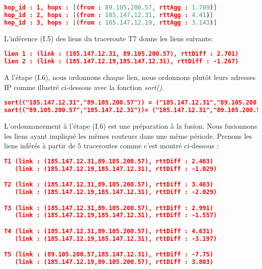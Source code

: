 \begin{lstlisting}[language=json,firstnumber=1, caption={Les saut du traceroute T7 (après l'agrégation)}]
hop_id : 1, hops : [(from : 89.105.200.57, rttAgg : 1.709)]
hop_id : 2, hops : [(from : 185.147.12.31, rttAgg : 4.41)] 
hop_id : 3, hops : [(from : 185.147.12.19, rttAgg : 3.143)]
\end{lstlisting}

L'inférence (I.5) des liens du traceroute T7 donne les liens suivants: 

\begin{lstlisting}[language=json,firstnumber=1, caption={Exemple des liens inférés du traceroute T7}, basicstyle = \small]
lien 1 : (link : (185.147.12.31, 89.105.200.57), rttDiff : 2.701)
lien 2 : (link : (185.147.12.19,185.147.12.31), rttDiff : -1.267)
\end{lstlisting}


A l'étape (I.6), nous ordonnons chaque lien, nous ordonnons plutôt leurs adresses IP comme illustré ci-dessous avec la fonction \textit{sort()}. 

\begin{lstlisting}[language=json,firstnumber=1, caption={Illustration de l'ordre des liens}, basicstyle = \footnotesize]
sort(("185.147.12.31","89.105.200.57")) = ("185.147.12.31","89.105.200.57")
sort(("89.105.200.57","185.147.12.31"))= ("185.147.12.31","89.105.200.57")   
\end{lstlisting}

L'ordonnancement à l'étape  (I.6) est une préparation à la fusion. Nous fusionnons les liens ayant impliqué les mêmes routeurs dans une même période. Prenons les liens inférés à partir de $5$ traceroutes  comme c'est montré ci-dessous :

\begin{lstlisting}[language=json,firstnumber=1, caption={Liste des liens possibles inférés via  les traceroutes T1, T2, T3, T4 et T5}, basicstyle = \footnotesize]
T1 (link : (185.147.12.31,89.105.200.57), rttDiff : 2.463)
   (link : (185.147.12.19,185.147.12.31), rttDiff : -1.029)

T2 (link : (185.147.12.31,89.105.200.57), rttDiff : 3.463) 
   (link : (185.147.12.19,185.147.12.31), rttDiff : -2.029)

T3 (link : (185.147.12.31,89.105.200.57), rttDiff : 2.991) 
   (link : (185.147.12.19,185.147.12.31), rttDiff : -1.557)

T4 (link : (185.147.12.31,89.105.200.57), rttDiff : 4.631) 
   (link : (185.147.12.19,185.147.12.31), rttDiff : -3.197)

T5 (link : (89.105.200.57,185.147.12.31), rttDiff : -7.75) 
   (link : (185.147.12.19,89.105.200.57), rttDiff : 3.803)
\end{lstlisting}

